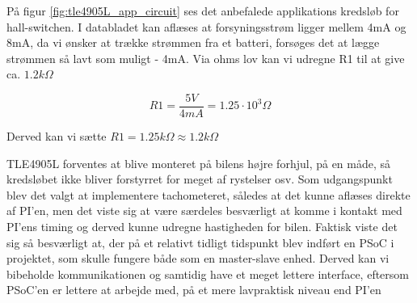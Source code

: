 På figur \ref{fig:tle4905L_app_circuit} ses det anbefalede applikations kredsløb for hall-switchen. I databladet kan aflæses at forsyningsstrøm ligger mellem 4mA og 8mA, da vi ønsker at trække strømmen fra et batteri, forsøges det at lægge strømmen så lavt som muligt - 4mA. Via ohms lov kan vi udregne R1 til at give ca. $1.2k\Omega$

\begin{equation}
R1 = \dfrac{5V}{4mA} = 1.25\cdot 10^3 \Omega
\end{equation}

Derved kan vi sætte $R1 = 1.25k\Omega \approx 1.2k\Omega$

TLE4905L forventes at blive monteret på bilens højre forhjul, på en måde, så kredsløbet ikke bliver forstyrret for meget af rystelser osv. Som udgangspunkt blev det valgt at implementere tachometeret, således at det kunne aflæses direkte af PI'en, men det viste sig at være særdeles besværligt at komme i kontakt med PI'ens timing og derved kunne udregne hastigheden for bilen. Faktisk viste det sig så besværligt at, der på et relativt tidligt tidspunkt blev indført en PSoC i projektet, som skulle fungere både som en master-slave enhed. Derved kan vi bibeholde \IIC kommunikationen og samtidig have et meget lettere interface, eftersom PSoC'en er lettere at arbejde med, på et mere lavpraktisk niveau end PI'en